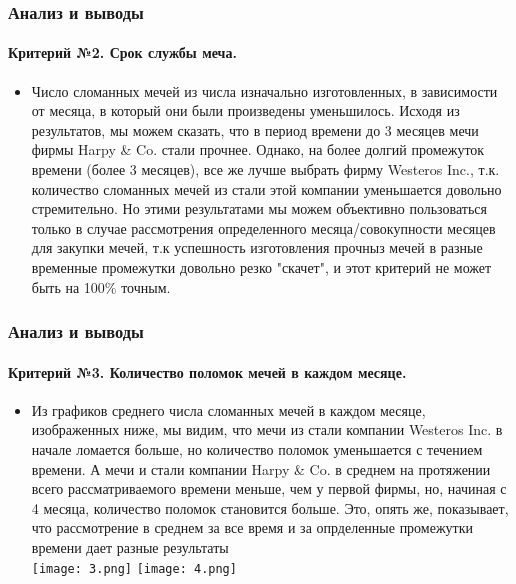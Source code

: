 \documentclass[8pt,pdf,hyperref={unicode}]{beamer}
\begin{document}
	\begin{frame}
		\frametitle{Анализ и выводы}
	\framesubtitle{Критерий №2. Срок службы меча.}
		\begin{itemize}
			\item  Число сломанных мечей из числа изначально изготовленных, в зависимости от месяца, в который они были произведены уменьшилось.
Исходя из результатов, мы можем сказать, что в период времени до 3 месяцев мечи  фирмы Harpy \& Co. стали прочнее.
Однако, на более долгий промежуток времени (более 3 месяцев), все же лучше выбрать фирму Westeros Inc., т.к. количество сломанных мечей из стали этой компании уменьшается довольно стремительно.
Но этими результатами мы можем объективно пользоваться только в случае рассмотрения определенного месяца/совокупности месяцев для закупки мечей, т.к успешность изготовления прочныз мечей в разные временные промежутки довольно резко "скачет", и этот критерий не может быть на 100\% точным. \\
			
		\end{itemize}
	\end{frame}
	
	\begin{frame}
	\frametitle{Анализ и выводы}
	\framesubtitle{Критерий №3. Количество поломок мечей в каждом месяце.}
	\begin{itemize}
		\item  Из графиков среднего числа сломанных мечей в каждом месяце, изображенных ниже, мы видим, что мечи из стали компании Westeros Inc. в начале ломается больше, но количество поломок уменьшается с течением времени. А мечи и стали компании Harpy \& Co. в среднем на протяжении всего рассматриваемого времени меньше, чем у первой фирмы, но, начиная с 4 месяца, количество поломок становится больше.
Это, опять же, показывает, что рассмотрение в среднем за все время и за опрделенные промежутки времени дает разные результаты\\
	
		\texttt{[image: 3.png]}		
		\texttt{[image: 4.png]}	
	\end{itemize}
	\end{frame}	
	
\end{document}
